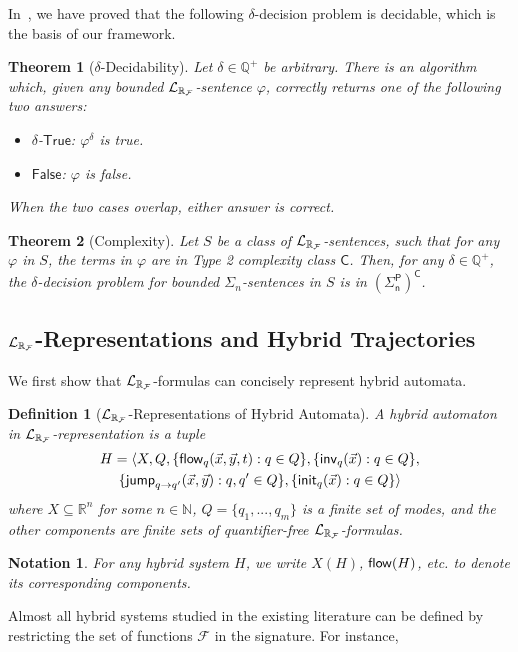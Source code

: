 \documentclass[journal]{IEEEtran}
\newtheorem{definition}{Definition}
\newtheorem{theorem}{Theorem}
\newtheorem{notation}{Notation}
\begin{document}
In~\cite{DBLP:conf/lics/GaoAC12,DBLP:conf/cade/GaoAC12}, we have proved that the following $\delta$-decision problem is decidable, which is the basis of our framework.
\begin{theorem}[$\delta$-Decidability]\label{delta-decide} Let $\delta\in\mathbb{Q}^+$ be
arbitrary. There is an algorithm which, given any bounded $\mathcal{L}_{\mathbb{R}_{\mathcal{F}}}$-sentence $\varphi$,
correctly returns one of the following two answers:
\begin{itemize}
\item $\delta$-$\mathsf{True}$: $\varphi^{\delta}$ is true.
\item $\mathsf{False}$: $\varphi$ is false.
\end{itemize}
When the two cases overlap, either answer is correct.
\end{theorem}
\begin{theorem}[Complexity]\label{compmain}
Let $S$ be a class of $\mathcal{L}_{\mathbb{R}_{\mathcal{F}}}$-sentences, such that for any $\varphi$ in $S$, the terms in $\varphi$ are in Type 2 complexity class $\mathsf{C}$. Then, for any $\delta\in \mathbb{Q}^+$, the $\delta$-decision problem for bounded $\Sigma_n$-sentences in $S$ is in $\mathsf{(\Sigma_n^P)^C}$.
\end{theorem}
\subsection{{\large$\mathcal{L}_{\mathbb{R}_{\mathcal{F}}}$}-Representations and Hybrid Trajectories}\label{language}
We first show that $\mathcal{L}_{\mathbb{R}_{\mathcal{F}}}$-formulas can concisely represent hybrid automata.
\begin{definition}[$\mathcal{L}_{\mathbb{R}_{\mathcal{F}}}$-Representations of Hybrid Automata]\label{lrf-definition}
A hybrid automaton in $\mathcal{L}_{\mathbb{R}_{\mathcal{F}}}$-representation is a tuple
\begin{multline*}
H = \langle X, Q, \{{\mathsf{flow}}_q(\vec x, \vec y, t): q\in Q\},\{\mathsf{inv}_q(\vec x): q\in Q\},\\
\{\mathsf{jump}_{q\rightarrow q'}(\vec x, \vec y): q,q'\in Q\},\{\mathsf{init}_q(\vec x): q\in Q\}\rangle
\end{multline*}
where $X\subseteq \mathbb{R}^n$ for some $n\in \mathbb{N}$, $Q=\{q_1,...,q_m\}$ is a finite set of modes, and the other components are finite sets of quantifier-free $\mathcal{L}_{\mathbb{R}_{\mathcal{F}}}$-formulas.
\end{definition}
\begin{notation}
For any hybrid system $H$, we write $X(H)$, $\mathsf{flow}(H)$, etc. to denote its corresponding components.
\end{notation}
Almost all hybrid systems studied in the existing literature can be defined by restricting the set of functions $\mathcal{F}$ in the signature. For instance,
\end{document}
